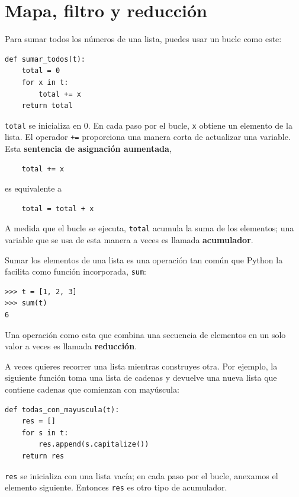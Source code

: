 \documentclass[10pt]{book}
\begin{document}
\section{Mapa, filtro y reducción}
\label{filter}

Para sumar todos los números de una lista, puedes usar un bucle como este:


\begin{verbatim}
def sumar_todos(t):
    total = 0
    for x in t:
        total += x
    return total
\end{verbatim}
%
{\tt total} se inicializa en 0.  En cada paso por el bucle,
{\tt x} obtiene un elemento de la lista.  El operador {\tt +=}
proporciona una manera corta de actualizar una variable.  Esta
{\bf sentencia de asignación aumentada},

\begin{verbatim}
    total += x
\end{verbatim}
%
es equivalente a

\begin{verbatim}
    total = total + x
\end{verbatim}
%
A medida que el bucle se ejecuta, {\tt total} acumula la suma de los
elementos; una variable que se usa de esta manera a veces es llamada
{\bf acumulador}.

Sumar los elementos de una lista es una operación tan común
que Python la facilita como función incorporada, {\tt sum}:

\begin{verbatim}
>>> t = [1, 2, 3]
>>> sum(t)
6
\end{verbatim}
%
Una operación como esta que combina una secuencia de elementos en
un solo valor a veces es llamada {\bf reducción}.

A veces quieres recorrer una lista mientras construyes
otra.  Por ejemplo, la siguiente función toma una lista de cadenas
y devuelve una nueva lista que contiene cadenas que comienzan con mayúscula:

\begin{verbatim}
def todas_con_mayuscula(t):
    res = []
    for s in t:
        res.append(s.capitalize())
    return res
\end{verbatim}
%
{\tt res} se inicializa con una lista vacía; en cada paso por el bucle,
anexamos el elemento siguiente.  Entonces {\tt res} es otro
tipo de acumulador.
\end{document}
